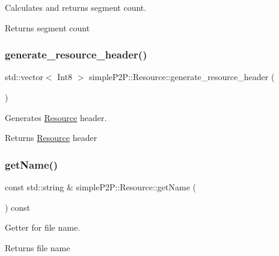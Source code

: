 Calculates and returns segment count. 

\begin{DoxyReturn}{Returns}
segment count 
\end{DoxyReturn}
\mbox{\label{classsimpleP2P_1_1Resource_ad2f3883ae1993c7788aecf34b8fb8470}} 
\subsubsection{\texorpdfstring{generate\+\_\+resource\+\_\+header()}{generate\_resource\_header()}}
{\footnotesize\ttfamily std\+::vector$<$ Int8 $>$ simple\+P2\+P\+::\+Resource\+::generate\+\_\+resource\+\_\+header (\begin{DoxyParamCaption}{ }\end{DoxyParamCaption})}



Generates \hyperlink{classsimpleP2P_1_1Resource}{Resource} header. 

\begin{DoxyReturn}{Returns}
\hyperlink{classsimpleP2P_1_1Resource}{Resource} header 
\end{DoxyReturn}
\mbox{\label{classsimpleP2P_1_1Resource_adc12496aedf1729852d2c98bf94428aa}} 
\subsubsection{\texorpdfstring{get\+Name()}{getName()}}
{\footnotesize\ttfamily const std\+::string \& simple\+P2\+P\+::\+Resource\+::get\+Name (\begin{DoxyParamCaption}{ }\end{DoxyParamCaption}) const}



Getter for file name. 

\begin{DoxyReturn}{Returns}
file name 
\end{DoxyReturn}
\mbox{\label{classsimpleP2P_1_1Resource_a866cdd2e717abf3515629ca73b2f80b8}} 

